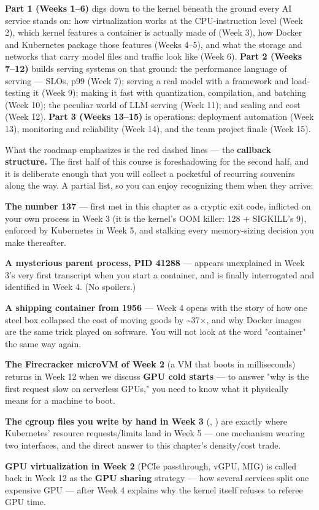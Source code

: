 \textbf{Part 1 (Weeks 1–6)} digs down to the kernel beneath the ground every AI service stands on: how virtualization works at the CPU-instruction level (Week 2), which kernel features a container is actually made of (Week 3), how Docker and Kubernetes package those features (Weeks 4–5), and what the storage and networks that carry model files and traffic look like (Week 6). \textbf{Part 2 (Weeks 7–12)} builds serving systems on that ground: the performance language of serving — SLOs, p99 (Week 7); serving a real model with a framework and load-testing it (Week 9); making it fast with quantization, compilation, and batching (Week 10); the peculiar world of LLM serving (Week 11); and scaling and cost (Week 12). \textbf{Part 3 (Weeks 13–15)} is operations: deployment automation (Week 13), monitoring and reliability (Week 14), and the team project finale (Week 15).

What the roadmap emphasizes is the red dashed lines — the \textbf{callback structure.} The first half of this course is foreshadowing for the second half, and it is deliberate enough that you will collect a pocketful of recurring souvenirs along the way. A partial list, so you can enjoy recognizing them when they arrive:

\begin{tbbitemize}
  \item \textbf{The number 137} — first met in this chapter as a cryptic exit code, inflicted on your own process in Week 3 (it is the kernel's OOM killer: 128 + SIGKILL's 9), enforced by Kubernetes in Week 5, and stalking every memory-sizing decision you make thereafter.
  \item \textbf{A mysterious parent process, PID 41288} — appears unexplained in Week 3's very first transcript when you start a container, and is finally interrogated and identified in Week 4. (No spoilers.)
  \item \textbf{A shipping container from 1956} — Week 4 opens with the story of how one steel box collapsed the cost of moving goods by \textasciitilde{}37×, and why Docker images are the same trick played on software. You will not look at the word "container" the same way again.
  \item \textbf{The Firecracker microVM of Week 2} (a VM that boots in milliseconds) returns in Week 12 when we discuss \textbf{GPU cold starts} — to answer "why is the first request slow on serverless GPUs," you need to know what it physically means for a machine to boot.
  \item \textbf{The cgroup files you write by hand in Week 3} (, ) are exactly where Kubernetes' resource requests/limits land in Week 5 — one mechanism wearing two interfaces, and the direct answer to this chapter's density/cost trade.
  \item \textbf{GPU virtualization in Week 2} (PCIe passthrough, vGPU, MIG) is called back in Week 12 as the \textbf{GPU sharing} strategy — how several services split one expensive GPU — after Week 4 explains why the kernel itself refuses to referee GPU time.
\end{tbbitemize}

